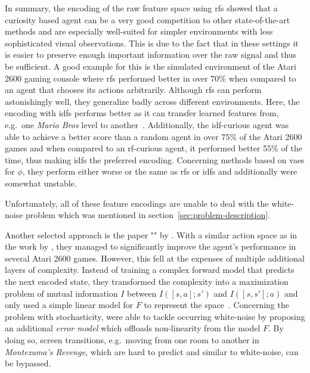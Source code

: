 \documentclass[draft,final]{vutinfth} %
\begin{document}

    In summary, the encoding of the raw feature space using \glspl{rf} showed that a curiosity based agent can be a very good competition to other state-of-the-art methods and are especially well-suited for simpler environments with less sophisticated visual observations.
    This is due to the fact that in these settings it is easier to preserve enough important information over the raw signal and thus be sufficient.
    A good example for this is the simulated environment of the Atari 2600 gaming console where \glspl{rf} performed better in over 70\% when compared to an agent that chooses its actions arbitrarily.
    Although \glspl{rf} can perform astonishingly well, they generalize badly across different environments.
    Here, the encoding with \glspl{idf} performs better as it can transfer learned features from, e.g.\ one \textit{Mario Bros} level to another~\citep{burda_large-scale_2018-1}.
    Additionally, the \gls{idf}-curious agent was able to achieve a better score than a random agent in over 75\% of the Atari 2600 games and when compared to an \gls{rf}-curious agent, it performed better 55\% of the time, thus making \glspl{idf} the preferred encoding.
    Concerning methods based on \glspl{vae} for $\phi$, they perform either worse or the same as \glspl{rf} or \glspl{idf} and additionally were somewhat unstable.

    Unfortunately, all of these feature encodings are unable to deal with the white-noise problem which was mentioned in section~\ref{sec:problem-description}.

    Another selected approach is the paper "" by \citet{kim_emi_2019}.
    With a similar action space as in the work by \citet{pathak_curiosity-driven_2017-1}, they managed to significantly improve the agent's performance in several Atari 2600 games.
    However, this fell at the expenses of multiple additional layers of complexity.
    Instead of training a complex forward model that predicts the next encoded state, they transformed the complexity into a maximization problem of mutual information $I$ between $I([s,a];s')$ and $I([s,s'];a)$ and only used a simple linear model for $F$ to represent the space~\citep{aubret_survey_2019}.
    Concerning the problem with stochasticity, \citet{kim_emi_2019} were able to tackle occurring white-noise by proposing an additional \textit{error model} which offloads non-linearity from the model $F$.
    By doing so, screen transitions, e.g.\ moving from one room to another in \textit{Montezuma's Revenge}, which are hard to predict and similar to white-noise, can be bypassed.
\end{document}
